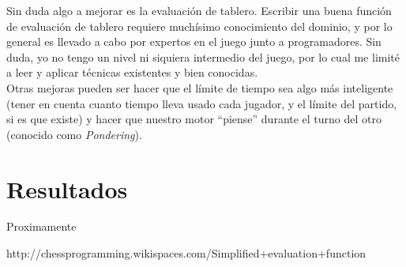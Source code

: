 \documentclass{article}
\begin{document}
Sin duda algo a mejorar es la evaluación de tablero. Escribir una buena
función de evaluación de tablero requiere muchísimo conocimiento
del dominio, y por lo general es llevado a cabo por expertos en el
juego junto a programadores. Sin duda, yo no tengo un nivel ni siquiera
intermedio del juego, por lo cual me limité a leer y aplicar técnicas
existentes y bien conocidas.
\\

Otras mejoras pueden ser hacer que el límite de tiempo sea algo más
inteligente (tener en cuenta cuanto tiempo lleva usado cada jugador,
y el límite del partido, si es que existe) y hacer que nuestro motor
``piense'' durante el turno del otro (conocido como \emph{Pondering}).
\\

\section{Resultados}
Proximamente

\begin{thebibliography}{9}

  http://chessprogramming.wikispaces.com/Simplified+evaluation+function

\end{thebibliography}
\end{document}
